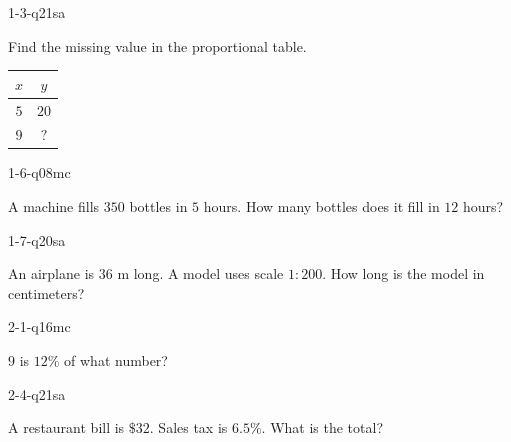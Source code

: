 
\begin{practiceQuestion}{1-3-q21}{sa}
\begin{questionText}
Find the missing value in the proportional table.

\begin{center}
\begin{tabular}{|c|c|}
\hline $x$ & $y$ \\ \hline $5$ & $20$ \\ $9$ & $?$ \\ \hline
\end{tabular}
\end{center}
\end{questionText}
\end{practiceQuestion}

\begin{practiceQuestion}{1-6-q08}{mc}
\begin{questionText}
A machine fills $350$ bottles in $5$ hours. How many bottles does it fill in $12$ hours?
\end{questionText}
\end{practiceQuestion}

\begin{practiceQuestion}{1-7-q20}{sa}
\begin{questionText}
An airplane is $36$ m long. A model uses scale $1 : 200$. How long is the model in centimeters?
\end{questionText}
\end{practiceQuestion}

\begin{practiceQuestion}{2-1-q16}{mc}
\begin{questionText}
$9$ is $12\%$ of what number?
\end{questionText}
\end{practiceQuestion}

\begin{practiceQuestion}{2-4-q21}{sa}
\begin{questionText}
A restaurant bill is $\$32$. Sales tax is $6.5\%$. What is the total?
\end{questionText}
\end{practiceQuestion}

